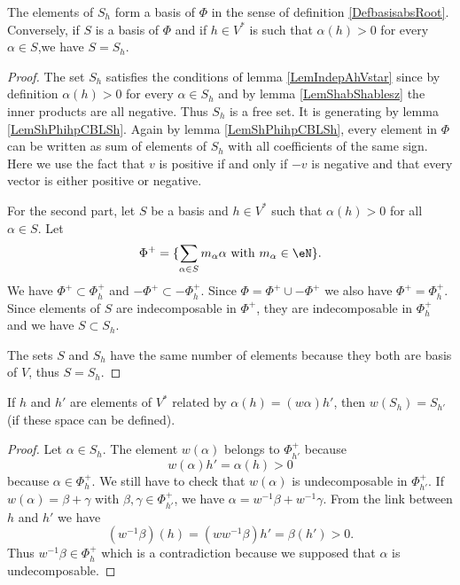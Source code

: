 \begin{proposition}\label{PropSestShsi}
    The elements of \( S_h\) form a basis of \( \Phi\) in the sense of definition \ref{DefbasisabsRoot}. Conversely, if \( S\) is a basis of \( \Phi\) and if \( h\in V^*\) is such that \( \alpha(h)>0\) for every \( \alpha\in S\),we have \( S=S_h\).
\end{proposition}

\begin{proof}
    The set \( S_h\) satisfies the conditions of lemma \ref{LemIndepAhVstar} since by definition \( \alpha(h)>0\) for every \( \alpha\in S_h\) and by lemma \ref{LemShabShablesz} the inner products are all negative. Thus \( S_h\) is a free set. It is generating by lemma \ref{LemShPhihpCBLSh}. Again by lemma \ref{LemShPhihpCBLSh}, every element in \( \Phi\) can be written as sum of elements of \( S_h\) with all coefficients of the same sign. Here we use the fact that \( v\) is positive if and only if \( -v\) is negative and that every vector is either positive or negative.

    For the second part, let \( S\) be a basis and \( h\in V^*\) such that \( \alpha(h)>0\) for all \( \alpha\in S\). Let
    \begin{equation}
        \Phi^+=\{ \sum_{\alpha\in S}m_{\alpha}\alpha \text{ with \( m_{\alpha}\in\eN\)} \}.
    \end{equation}
    We have \( \Phi^+\subset\Phi_h^+\) and \( -\Phi^+\subset -\Phi_h^+\). Since \( \Phi=\Phi^+\cup-\Phi^+\) we also have \( \Phi^+=\Phi_h^+\). Since elements of \( S\) are indecomposable in \( \Phi^+\), they are indecomposable in \( \Phi^+_h\) and we have \( S\subset S_h\).

    The sets \( S\) and \( S_h\) have the same number of elements because they both are basis of \( V\), thus \( S=S_h\).
\end{proof}

\begin{lemma}\label{LemwShShpahwahp}
    If \( h\) and \( h'\) are elements of \( V^*\) related by \( \alpha(h)=(w\alpha)h'\), then \( w(S_h)=S_{h'}\) (if these space can be defined).
\end{lemma}

\begin{proof}
    Let \( \alpha\in S_h\). The element \( w(\alpha)\) belongs to \( \Phi_{h'}^+\) because
    \begin{equation}
        w(\alpha)h'=\alpha(h)>0
    \end{equation}
    because \( \alpha\in\Phi_h^+\). We still have to check that \( w(\alpha)\) is undecomposable in \( \Phi_{h'}^+\). If \( w(\alpha)=\beta+\gamma\) with \( \beta,\gamma\in\Phi_{h'}^+\), we have \( \alpha=w^{-1}\beta+w^{-1}\gamma\). From the link between \( h\) and \( h'\) we have
    \begin{equation}
        (w^{-1}\beta)(h)=(ww^{-1}\beta)h'=\beta(h')>0.
    \end{equation}
    Thus \( w^{-1}\beta\in \Phi_h^+\) which is a contradiction because we supposed that \( \alpha\) is undecomposable.
\end{proof}

